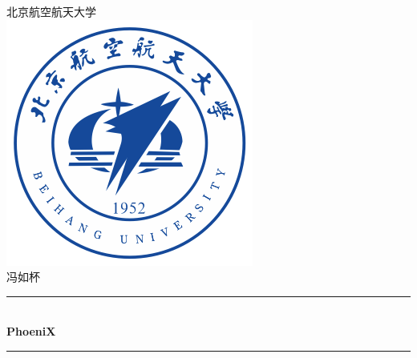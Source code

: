 \begin{titlepage}

\newcommand{\HRule}{\rule{\linewidth}{0.5mm}} %

\center %
 

\textsc{\LARGE  北京航空航天大学}\\[1.5cm] %
\includegraphics[scale=0.9]{figure/buaa_logo.png}\\[1cm] %
\textsc{\Large 冯如杯}\\[0.5cm] %


\HRule \\[1cm]
{ \huge  \bfseries PhoeniX}\\[0.4cm] %
\HRule \\[1cm]
 


\end{titlepage}
